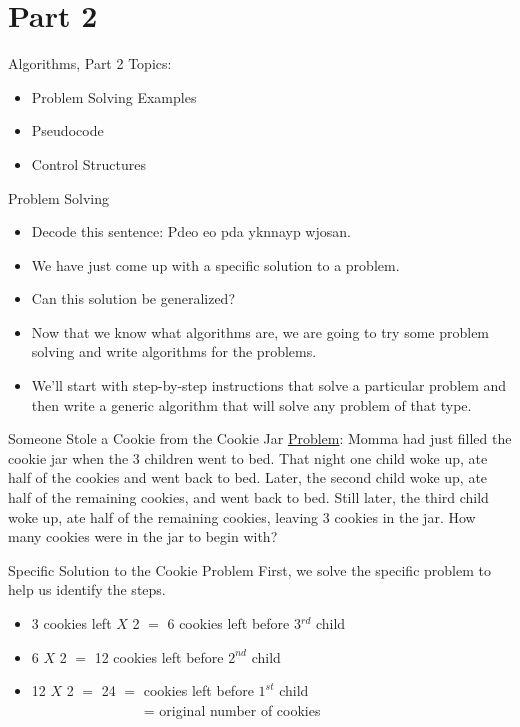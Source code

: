 \documentclass[graphics]{beamer}
\begin{document}
\section*{Part 2}
\begin{frame}{Algorithms, Part 2}
    Topics:
    \begin{itemize}
        \item Problem Solving Examples
        \item Pseudocode
        \item Control Structures
    \end{itemize}
\end{frame}

\begin{frame}{Problem Solving}
    \begin{itemize}
        \item Decode this sentence: Pdeo eo pda yknnayp wjosan.
        \item We have just come up with a specific solution to a problem.
        \item Can this solution be generalized?
        \pause
        \item Now that we know what algorithms are, we are going to try some problem solving and write algorithms for the problems.
        \item We’ll start with step-by-step instructions that solve a particular problem and then write a generic algorithm that will solve any problem of that type.
    \end{itemize}
\end{frame}

\begin{frame}{Someone Stole a Cookie from the Cookie Jar}
    \underline{Problem}: Momma had just filled the cookie jar when the 3 children went to bed.  That night one child woke up, ate half of the cookies and went back to bed.  Later, the second child woke up, ate half of the remaining cookies, and went back to bed.  Still later, the third child woke up, ate half of the remaining cookies, leaving 3 cookies in the jar.  How many cookies were in the jar to begin with?
\end{frame}

\begin{frame}{Specific Solution to the Cookie Problem}
    First, we solve the specific problem to help us identify the steps.
    \begin{itemize}
        \item 3 cookies left $X$ 2 $=$ 6 cookies left before 3$^{rd}$ child
        \item 6 $X$ 2 $=$ 12 cookies left before $2^{nd}$ child
        \item 12 $X$ 2 $=$ 24 $=$ cookies left before $1^{st}$ child \\
        ~~ ~~ ~~ ~~ ~~ ~~ = original number of cookies
    \end{itemize}
\end{frame}
\end{document}
